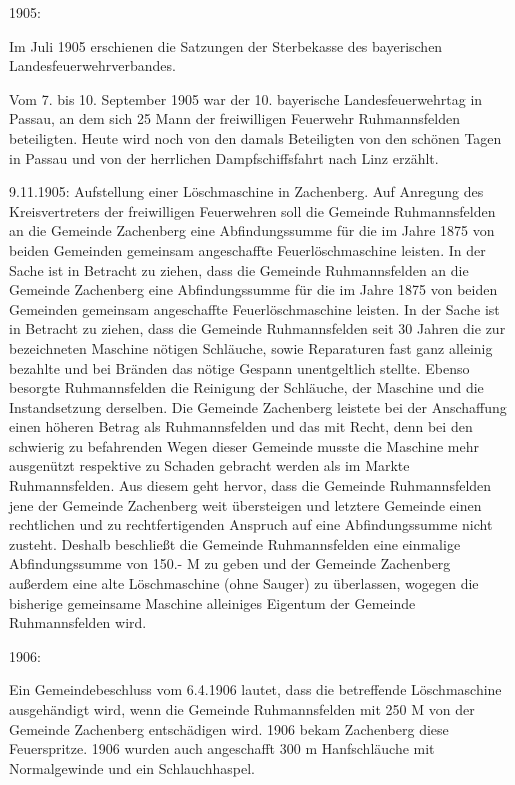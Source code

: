 1905:

Im Juli 1905 erschienen die Satzungen der Sterbekasse des bayerischen
Landesfeuerwehrverbandes.

Vom 7. bis 10. September 1905 war der 10. bayerische Landesfeuerwehrtag in
Passau, an dem sich 25 Mann der freiwilligen Feuerwehr Ruhmannsfelden
beteiligten. Heute wird noch von den damals Beteiligten von den schönen Tagen in
Passau und von der herrlichen Dampfschiffsfahrt nach Linz erzählt.

9.11.1905: Aufstellung einer Löschmaschine in Zachenberg. Auf Anregung des
Kreisvertreters der freiwilligen Feuerwehren soll die Gemeinde Ruhmannsfelden an
die Gemeinde Zachenberg eine Abfindungssumme für die im Jahre 1875 von beiden
Gemeinden gemeinsam angeschaffte Feuerlöschmaschine leisten. In der Sache ist in
Betracht zu ziehen, dass die Gemeinde Ruhmannsfelden an die Gemeinde Zachenberg
eine Abfindungssumme für die im Jahre 1875 von beiden Gemeinden gemeinsam
angeschaffte Feuerlöschmaschine leisten. In der Sache ist in Betracht zu ziehen,
dass die Gemeinde Ruhmannsfelden seit 30 Jahren die zur bezeichneten Maschine
nötigen Schläuche, sowie Reparaturen fast ganz alleinig bezahlte und bei Bränden
das nötige Gespann unentgeltlich stellte. Ebenso besorgte Ruhmannsfelden die
Reinigung der Schläuche, der Maschine und die Instandsetzung derselben. Die
Gemeinde Zachenberg leistete bei der Anschaffung einen höheren Betrag als
Ruhmannsfelden und das mit Recht, denn bei den schwierig zu befahrenden Wegen
dieser Gemeinde musste die Maschine mehr ausgenützt respektive zu Schaden
gebracht werden als im Markte Ruhmannsfelden. Aus diesem geht hervor, dass die
Gemeinde Ruhmannsfelden jene der Gemeinde Zachenberg weit übersteigen und
letztere Gemeinde einen rechtlichen und zu rechtfertigenden Anspruch auf eine
Abfindungssumme nicht zusteht. Deshalb beschließt die Gemeinde Ruhmannsfelden
eine einmalige Abfindungssumme von 150.- M zu geben und der Gemeinde Zachenberg
außerdem eine alte Löschmaschine (ohne Sauger) zu überlassen, wogegen die
bisherige gemeinsame Maschine alleiniges Eigentum der Gemeinde Ruhmannsfelden
wird.

1906:

Ein Gemeindebeschluss vom 6.4.1906 lautet, dass die betreffende Löschmaschine
ausgehändigt wird, wenn die Gemeinde Ruhmannsfelden mit 250 M von der Gemeinde
Zachenberg entschädigen wird. 1906 bekam Zachenberg diese Feuerspritze. 1906
wurden auch angeschafft 300 m Hanfschläuche mit Normalgewinde und ein
Schlauchhaspel.

